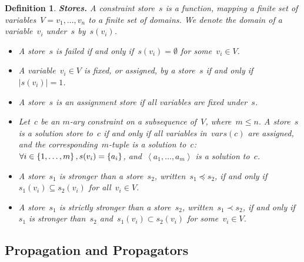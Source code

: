 \documentclass[a4paper,11pt]{article}
\newtheorem{definition}{Definition}
\newcommand{\Dom}[1]{\text{dom}({#1})}
\numberwithin{equation}{section}
\begin{document}
\begin{definition}
  \textbf{Stores.} A \emph{constraint store}~$s$ is a function, mapping a finite set of
  variables~$V = v_1, \ldots, v_n$ to a finite set of domains. We denote the domain of
  a variable~$v_i$ under~$s$ by~$s(v_i)$.%
  \begin{itemize}
    \item A store~$s$ is \emph{failed} if and only if~$s(v_i) = \emptyset$ for some~$v_i \in V$.
    
    \item   A variable~$v_i \in V$ is \emph{fixed}, or \emph{assigned},
      by a store~$s$ if and only if~$|s(v_i)| = 1$. 
    
    \item A store~$s$ is an \emph{assignment store} if all variables are 
      fixed under~$s$.


    \item Let~$c$ be an $m$-ary constraint on a subsequence of~$V$,
      where~$m \leq n$. A store~$s$ is a \emph{solution store} 
      to~$c$ if and only if all variables in~$\mathit{vars}(c)$
      are assigned, and the corresponding~$m$-tuple is a solution to~$c$:
      $\forall i \in \left\{1,\ldots,m\right\}, s(v_i) = \left\{a_i\right\}$,
      and~$\left<a_1,\ldots,a_m\right>$ is a solution to~$c$.

    \item A store~$s_1$ is \emph{stronger} than a store~$s_2$, 
      written~$s_1 \preceq s_2$, if and only if~$s_1(v_i) \subseteq s_2(v_i)$ 
      for all~$v_i \in V$.
    
    \item A store~$s_1$ is \emph{strictly stronger} than a store~$s_2$, 
      written~$s_1 \prec s_2$, if and only if~$s_1$ is stronger than~$s_2$
      and~$s_1(v_i) \subset s_2(v_i)$ for some~$v_i \in V$. 
      
  \end{itemize}

\end{definition}

\subsection{Propagation and Propagators}
\label{bg:propagation}
\end{document}
